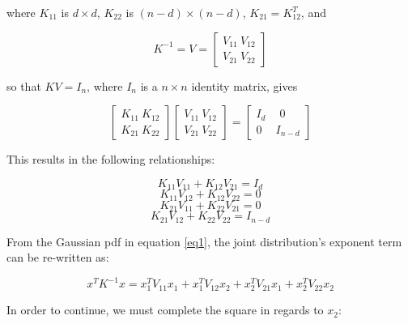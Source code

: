 where $K_{11}$ is $d \times d$, $K_{22}$ is $(n-d) \times (n-d)$, $K_{21} = K_{12}^T$, and

\begin{equation}\label{eq3}
K^{-1} =V=\left[\begin{array}{cc}{V}_{11} \ {V}_{12}\\ {V}_{21}\ {V}_{22}\end{array}\right]
\end{equation}

so that $KV = I_n$, where $I_n$ is a $n \times n$ identity matrix, gives

\begin{equation}\label{eq4}
\left[\begin{array}{cc}{K}_{11} \ {K}_{12}\\ {K}_{21}\ {K}_{22}\end{array}\right]
\left[\begin{array}{cc}{V}_{11} \ {V}_{12}\\ {V}_{21}\ {V}_{22}\end{array}\right]
=
\left[\begin{array}{cc}{I}_{d} \ \quad 0\\ 0\ \quad {I}_{n-d}\end{array}\right]
\end{equation}

This results in the following relationships:

\begin{equation}\label{eq5}
{K}_{11}{V}_{11} + {K}_{12}{V}_{21} = I_d
\end{equation}
\begin{equation}\label{eq6}
{K}_{11}{V}_{12} + {K}_{12}{V}_{22} = 0
\end{equation}
\begin{equation}\label{eq7}
{K}_{21}{V}_{11} + {K}_{22}{V}_{21} = 0
\end{equation}
\begin{equation}\label{eq8}
{K}_{21}{V}_{12} + {K}_{22}{V}_{22} = I_{n-d}
\end{equation}

From the Gaussian pdf in equation \ref{eq1}, the joint distribution's exponent term can be re-written as:

\begin{equation}\label{eq9}
x^TK^{-1}x=x_1^TV_{11}x_1+x_1^TV_{12}x_2+x_2^TV_{21}x_1+x_2^TV_{22}x_2
\end{equation}

In order to continue, we must complete the square in regards to $x_2$:

